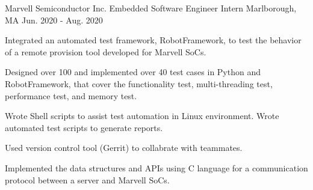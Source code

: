 

\begin{cventries}

  
  \cventry
  {Marvell Semiconductor Inc.} 
  {Embedded Software Engineer Intern} %
  {Marlborough, MA} %
  {Jun. 2020 - Aug. 2020} %
  {
    \begin{cvitems} %
      \item Integrated an automated test framework, RobotFramework, to test the behavior of a remote provision tool developed for Marvell SoCs.
      \item Designed over 100 and implemented over 40 test cases in Python and RobotFramework, that cover the functionality test, multi-threading test, performance test, and memory test.
      \item Wrote Shell scripts to assist test automation in Linux environment. Wrote automated test scripts to generate reports.
      \item Used version control tool (Gerrit) to collabrate with teammates.
      \item Implemented the data structures and APIs using C language for a communication protocol between a server and Marvell SoCs.
    \end{cvitems}
  }



\end{cventries}
